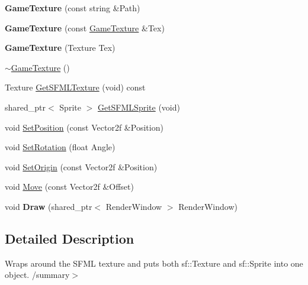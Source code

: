 \begin{DoxyCompactItemize}
\item 
\mbox{\label{class_engine_1_1_core_1_1_game_texture_ae9eb069dd4a60ad5af6e19ca35432ea2}} 
{\bfseries Game\+Texture} (const string \&Path)
\item 
\mbox{\label{class_engine_1_1_core_1_1_game_texture_a5d6076b052118c2212b103cbdf3ea836}} 
{\bfseries Game\+Texture} (const \hyperlink{class_engine_1_1_core_1_1_game_texture}{Game\+Texture} \&Tex)
\item 
\mbox{\label{class_engine_1_1_core_1_1_game_texture_aac115d213538922ab88a656b6780b6b3}} 
{\bfseries Game\+Texture} (Texture Tex)
\item 
\hyperlink{class_engine_1_1_core_1_1_game_texture_a37c2ee2ebfdfc3301b6070d2df10d59a}{$\sim$\+Game\+Texture} ()
\item 
Texture \hyperlink{class_engine_1_1_core_1_1_game_texture_a07e51ed155d0c9b24197444b473cbf19}{Get\+S\+F\+M\+L\+Texture} (void) const
\item 
shared\+\_\+ptr$<$ Sprite $>$ \hyperlink{class_engine_1_1_core_1_1_game_texture_aec2df0beae7b8693160e20c1fd3588ac}{Get\+S\+F\+M\+L\+Sprite} (void)
\item 
void \hyperlink{class_engine_1_1_core_1_1_game_texture_ae1f94e0f1b86e99ed4508ccdda4872d6}{Set\+Position} (const Vector2f \&Position)
\item 
void \hyperlink{class_engine_1_1_core_1_1_game_texture_a5ed78714df6128f09c35c25e2271dc05}{Set\+Rotation} (float Angle)
\item 
void \hyperlink{class_engine_1_1_core_1_1_game_texture_aa01df5d689abf48b1d442da329485eeb}{Set\+Origin} (const Vector2f \&Position)
\item 
void \hyperlink{class_engine_1_1_core_1_1_game_texture_af0169ac026c5b15cb3195d1199b13d33}{Move} (const Vector2f \&Offset)
\item 
\mbox{\label{class_engine_1_1_core_1_1_game_texture_a103ed3e78d64382d3e82b5fca05ceccd}} 
void {\bfseries Draw} (shared\+\_\+ptr$<$ Render\+Window $>$ Render\+Window)
\end{DoxyCompactItemize}


\subsection{Detailed Description}
Wraps around the S\+F\+ML texture and puts both sf\+::\+Texture and sf\+::\+Sprite into one object. /summary$>$ 

